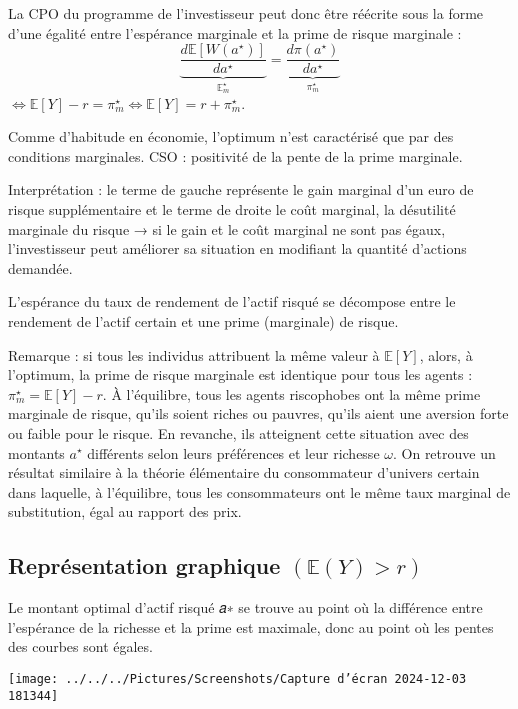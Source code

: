 \documentclass[a4paper, 12pt]{report}
\begin{document}
La CPO du programme de l'investisseur peut donc être réécrite sous la forme d'une égalité entre l'espérance marginale et la prime de risque marginale :
\[
\underbrace{\frac{d\mathbb{E}[W(a^{\star})]}{da^{\star}}}_{\mathbb{E}^{\star}_m}= \underbrace{\frac{d\pi(a^{\star})}{da^{\star}}}_{\pi^{\star}_m} 
\]
\(\Leftrightarrow \mathbb{E}[Y] - r = \pi_m^{\star} \Leftrightarrow \mathbb{E}[Y] = r + \pi_m^{\star}\).

Comme d'habitude en économie, l'optimum n'est caractérisé que par des conditions marginales. CSO : positivité de la pente de la prime marginale.

Interprétation : le terme de gauche représente le gain marginal d'un euro de risque supplémentaire et le terme de droite le coût marginal, la désutilité marginale du risque → si le gain et le coût marginal ne sont pas égaux, l'investisseur peut améliorer sa situation en modifiant la quantité d'actions demandée.

L'espérance du taux de rendement de l'actif risqué se décompose entre le rendement de l'actif certain et une prime (marginale) de risque.

Remarque : si tous les individus attribuent la même valeur à \(\mathbb{E}[Y]\), alors, à l'optimum, la prime de risque marginale est identique pour tous les agents : \(\pi_m^{\star} = \mathbb{E}[Y] - r\). À l'équilibre, tous les agents riscophobes ont la même prime marginale de risque, qu'ils soient riches ou pauvres, qu'ils aient une aversion forte ou faible pour le risque. En revanche, ils atteignent cette situation avec des montants \(a^{\star}\) différents selon leurs préférences et leur richesse \(\omega\). On retrouve un résultat similaire à la théorie élémentaire du consommateur d'univers certain dans laquelle, à l'équilibre, tous les consommateurs ont le même taux marginal de substitution, égal au rapport des prix.

\subsection{Représentation graphique \((\mathbb{E}(Y)>r) \)}

Le montant optimal d'actif risqué 𝑎∗ se trouve au point où la différence
entre l'espérance de la richesse et la prime est maximale, donc au
point où les pentes des courbes sont égales.
\begin{center}
	\texttt{[image: ../../../Pictures/Screenshots/Capture d'écran 2024-12-03 181344]}
\end{center}
\end{document}
